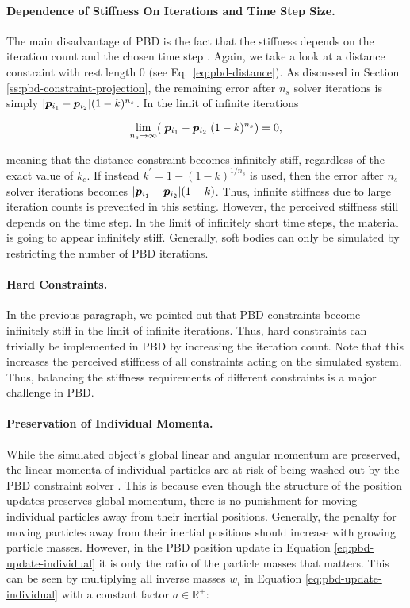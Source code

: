 \paragraph{Dependence of Stiffness On Iterations and Time Step Size.}
The main disadvantage of PBD is the fact that the stiffness depends on the iteration count and the chosen time step \cite{mueller2006}. Again, 
we take a look at a distance constraint with rest length 0 (see Eq.\ \ref{eq:pbd-distance}). As discussed in Section 
\ref{ss:pbd-constraint-projection}, the remaining error after $n_s$ solver iterations is simply $\vert \bm{p}_{i_1} - \bm{p}_{i_2} \vert 
(1-k)^{n_s}$. In the limit of infinite iterations

\[
    \lim_{n_s \to \infty} (\vert \bm{p}_{i_1} - \bm{p}_{i_2} \vert (1-k)^{n_s}) = 0,
\]

\noindent meaning that the distance constraint becomes infinitely stiff, regardless of the exact value of $k_c$. If instead $k^{\prime}
= 1 - (1-k)^{1/n_s}$ is used, then the error after $n_s$ solver iterations becomes $\vert \bm{p}_{i_1} - \bm{p}_{i_2} \vert (1-k)$. Thus,
infinite stiffness due to large iteration counts is prevented in this setting. However, the perceived stiffness still depends on the time
step. In the limit of infinitely short time steps, the material is going to appear infinitely stiff. Generally, soft bodies can only be 
simulated by restricting the number of PBD iterations.

\paragraph{Hard Constraints.}
In the previous paragraph, we pointed out that PBD constraints become infinitely stiff in the limit of infinite iterations. Thus, hard constraints 
can trivially be implemented in PBD by increasing the iteration count. Note that this increases the perceived stiffness of all constraints acting 
on the simulated system. Thus, balancing the stiffness requirements of different constraints is a major challenge in PBD.

\paragraph{Preservation of Individual Momenta.}
While the simulated object's global linear and angular momentum are preserved, the linear momenta of individual particles are at risk of 
being washed out by the PBD constraint solver \cite{bouaziz2014}. This is because even though the structure of the position updates 
preserves global momentum, there is no punishment for moving individual particles away from their inertial positions. Generally, the 
penalty for moving particles away from their inertial positions should increase with growing particle masses. However, in the PBD
position update in Equation \ref{eq:pbd-update-individual} it is only the ratio of the particle masses that matters. This can be seen by multiplying
all inverse masses $w_i$ in Equation \ref{eq:pbd-update-individual} with a constant factor $a \in \mathbb{R}^+$:

